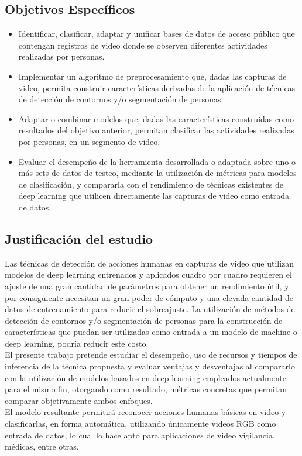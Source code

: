 \subsection{Objetivos Específicos}

\begin{itemize}
	\item Identificar, clasificar, adaptar y unificar bases de datos de acceso público que contengan registros de video donde se observen diferentes actividades realizadas por personas.
	\item Implementar un algoritmo de preprocesamiento que, dadas las capturas de video, permita construir características derivadas de la aplicación de técnicas de detección de contornos y/o segmentación de personas.
	\item Adaptar o combinar modelos que, dadas las características construidas como resultados del objetivo anterior, permitan clasificar las actividades realizadas por personas, en un segmento de video.
	\item Evaluar el desempeño de la herramienta desarrollada o adaptada sobre uno o más sets de datos de testeo, mediante la utilización de métricas para modelos de clasificación, y compararla con el rendimiento de técnicas existentes de deep learning que utilicen directamente las capturas de video como entrada de datos.
\end{itemize}

\subsection{Justificación del estudio}

Las técnicas de detección de acciones humanas en capturas de video que utilizan modelos de deep learning entrenados y aplicados cuadro por cuadro requieren el ajuste de una gran cantidad de parámetros para obtener un rendimiento útil, y por consiguiente necesitan un gran poder de cómputo y una elevada cantidad de datos de entrenamiento para reducir el sobreajuste. La utilización de métodos de detección de contornos y/o segmentación de personas para la construcción de características que puedan ser utilizadas como entrada a un modelo de machine o deep learning, podría reducir este costo. \\

El presente trabajo pretende estudiar el desempeño, uso de recursos y tiempos de inferencia de la técnica propuesta y evaluar ventajas y desventajas al compararlo con la utilización de modelos basados en deep learning empleados actualmente para el mismo fin, otorgando como resultado, métricas concretas que permitan comparar objetivamente ambos enfoques. \\

El modelo resultante permitirá reconocer acciones humanas básicas en video y clasificarlas, en forma automática, utilizando únicamente videos RGB como entrada de datos, lo cual lo hace apto para aplicaciones de video vigilancia, médicas, entre otras.
